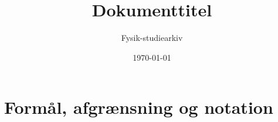 \documentclass[11pt,a4paper,oneside]{book}
\title{Dokumenttitel}
\author{Fysik-studiearkiv}
\date{\today}
\begin{document}
\maketitle
\tableofcontents
\chapter{Formål, afgrænsning og notation}
\end{document}
